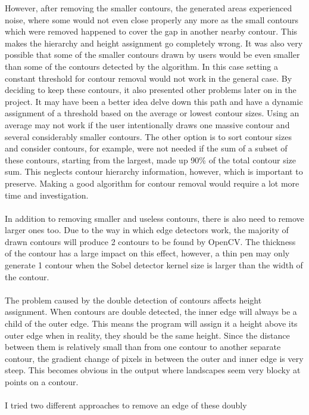 \documentclass[11pt]{article}
\begin{document}
However, after removing the smaller contours, the generated areas experienced
noise, where some would not even close properly any more as the small
contours which were removed happened to cover the gap in another nearby 
contour. This makes the hierarchy and height assignment go completely
wrong. It was also very possible that some of the smaller contours drawn by users 
would be even smaller than some of the contours detected by the algorithm. 
In this case setting a constant threshold for contour removal would not work
in the general case. By deciding to keep these contours, it also presented
other problems later on in the project. It may have been a better idea
delve down this path and have a dynamic assignment of a threshold based on
the average or lowest contour sizes. Using an average may not work if the user
intentionally draws one massive contour and several considerably smaller 
contours. The other option is to sort contour sizes and consider contours,
for example, were not needed if the sum of a subset of these contours, starting
from the largest, made up 90\% of the total contour size sum. This neglects 
contour hierarchy information, however, which is important to preserve.
Making a good algorithm for contour removal would require a lot more time
and investigation.\\
\\
In addition to removing smaller and useless contours, there is also need
to remove larger ones too. Due to the way in which edge detectors work,
the majority of drawn contours will produce 2 contours to be found by
OpenCV. The thickness of the contour has a large impact on this effect,
however, a thin pen may only generate 1 contour when the Sobel detector 
kernel size is larger than the width of the contour.\\
\\
The problem caused by the double detection of contours affects height
assignment. When contours are double detected, the inner edge will always be
a child of the outer edge. This means the program will assign it
a height above its outer edge when in reality, they should be the same height.
Since the distance between them is relatively small than from one contour
to another separate contour, the gradient change of pixels in between 
the outer and inner edge is very steep. This becomes obvious in the output
where landscapes seem very blocky at points on a contour.\\
\\
I tried two different approaches to remove an edge of these doubly 
\end{document}
